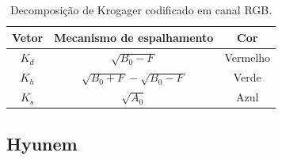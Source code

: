\documentclass{article}
\begin{document}
\begin{table}[H]
    \centering
    \begin{tabular}{|c|c|c|}
         \hline
         Vetor & Mecanismo de espalhamento & Cor \\ \hline
         $K_{d}$ & $\sqrt{B_{0}-F}$ & Vermelho \\ \hline
         $K_{h}$ & $\sqrt{B_{0}+F} - \sqrt{B_{0}-F}$ & Verde \\ \hline
         $K_{s}$ & $\sqrt{A_{0}}$ & Azul \\ \hline
    \end{tabular}
    \caption{Decomposição de Krogager codificado em canal RGB.}
    \label{tab:code_color_krogager}
\end{table}

\subsection{\textbf{Hyunem}}
\end{document}
